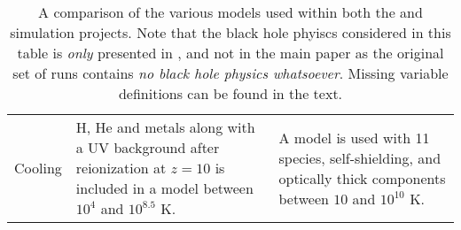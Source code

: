\begin{table*}
\begin{tabularx}{\textwidth}{cXX}
    Cooling & H, He and metals along with a UV background after reionization at $z=10$ is included in a \citet{sutherland_cooling_1993} model between $10^4$ and $10^{8.5}$ K. & A \citet{hopkins_galaxies_2014} model is used with 11 species, self-shielding, and optically thick components between $10$ and $10^{10}$ K. 
  \end{tabularx}
  \caption{A comparison of the various models used within both the \hagn{} and
    \fire{} simulation projects. Note that the black hole phyiscs considered in
    this table is \emph{only} presented in \citet{angles-alcazar_black_2017},
    and not in the main \fire{} paper \citep{hopkins_fire-2_2017} as the
    original set of \fire{} runs contains \emph{no black hole physics
    whatsoever}. Missing variable definitions can be found in the text.}
  \label{tab:comparison}
\end{table*}
\restoregeometry

